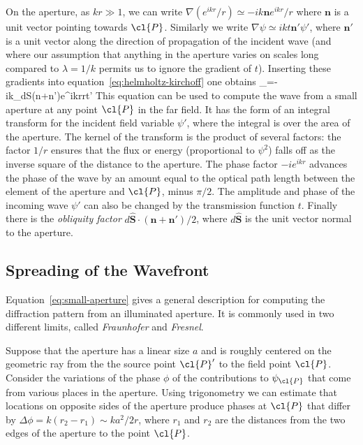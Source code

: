 On the aperture, as $kr\gg 1$, we can write $\nabla({e^{ikr}/r})\simeq -{ik{\bm n}e^{ikr}/r}$ 
where ${\bm n}$ is a unit vector pointing towards $\cl{P}$. Similarly we write 
$\nabla\psi\simeq ikt{\bm n'}\psi'$, where ${\bm n'}$ is a unit vector along the direction
of propagation of the incident wave (and where our assumption that anything in the aperture
varies on scales long compared to $\lambda={1/k}$ permits us to ignore the gradient of $t$).
Inserting these gradients into equation~\ref{eq:helmholtz-kirchoff} one obtains
\be
\psi_=-{ik\pi}\int_d{\bm S}\cdot\left({{\bm n}+{\bm n'}}\right){e^{ikr}\over r}t\psi'
\label{eq:small-aperture}
\ee
This equation can be used to compute the wave from a small aperture at any point $\cl{P}$ in 
the far field. It has the form of an integral transform for the incident field variable $\psi'$,
where the integral is over the area of the aperture. The kernel of the transform is the 
product of several factors: the factor ${1/r}$ ensures that the flux or energy (proportional
to $\psi^2$) falls off as the inverse square of the distance to the aperture. The phase 
factor $-ie^{ikr}$ advances the phase of the wave by an amount equal to the optical path 
length between the element of the aperture and $\cl{P}$, minus ${\pi/2}$. The amplitude and
phase of the incoming wave $\psi'$ can also be changed by the transmission function $t$.
Finally there is the {\it obliquity factor} ${d\hat{\bm S}\cdot({\bm n}+{\bm n'})/2}$, where 
$d\hat{\bm S}$ is the unit vector normal to the aperture. 

\subsection{Spreading of the Wavefront}

Equation~\ref{eq:small-aperture} gives a general description for computing the diffraction 
pattern from an illuminated aperture. It is commonly used in two different limits, called
{\it Fraunhofer} and {\it Fresnel}.

Suppose that the aperture has a linear size $a$ and is roughly centered on the geometric ray
from the the source point $\cl{P}'$ to the field point $\cl{P}$. Consider the variations of 
the phase $\phi$ of the contributions to $\psi_\cl{P}$ that come from various places in the
aperture. Using trigonometry we can estimate that locations on opposite sides of the aperture
produce phases at $\cl{P}$ that differ by $\Delta\phi=k(r_2-r_1)\sim {ka^2/2r}$, where $r_1$ and
$r_2$ are the distances from the two edges of the aperture to the point $\cl{P}$. 

